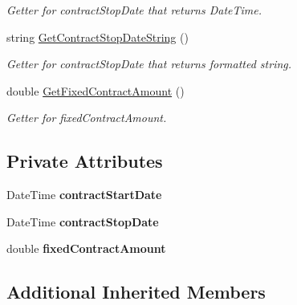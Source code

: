 \begin{DoxyCompactItemize}
\begin{DoxyCompactList}\small\item\em Getter for contract\+Stop\+Date that returns Date\+Time. \end{DoxyCompactList}\item 
string \hyperlink{class_all_employees_1_1_contract_employee_ada12137c290146af671d8e9b8db2b3fa}{Get\+Contract\+Stop\+Date\+String} ()
\begin{DoxyCompactList}\small\item\em Getter for contract\+Stop\+Date that returns formatted string. \end{DoxyCompactList}\item 
double \hyperlink{class_all_employees_1_1_contract_employee_ade999a96f8a2f43306980715ded26e47}{Get\+Fixed\+Contract\+Amount} ()
\begin{DoxyCompactList}\small\item\em Getter for fixed\+Contract\+Amount. \end{DoxyCompactList}\end{DoxyCompactItemize}
\subsection*{Private Attributes}
\begin{DoxyCompactItemize}
\item 
\hypertarget{class_all_employees_1_1_contract_employee_aeef462cc8bd0639b674bba0632b6586b}{}Date\+Time {\bfseries contract\+Start\+Date}\label{class_all_employees_1_1_contract_employee_aeef462cc8bd0639b674bba0632b6586b}

\item 
\hypertarget{class_all_employees_1_1_contract_employee_ab549d2c8addad182fd66246c41ca73b7}{}Date\+Time {\bfseries contract\+Stop\+Date}\label{class_all_employees_1_1_contract_employee_ab549d2c8addad182fd66246c41ca73b7}

\item 
\hypertarget{class_all_employees_1_1_contract_employee_a8b9cdb0dd7f6e9cd04baa6c60e6edc63}{}double {\bfseries fixed\+Contract\+Amount}\label{class_all_employees_1_1_contract_employee_a8b9cdb0dd7f6e9cd04baa6c60e6edc63}

\end{DoxyCompactItemize}
\subsection*{Additional Inherited Members}


